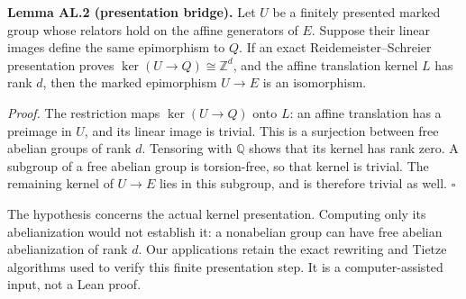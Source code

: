 \textbf{Lemma AL.2 (presentation bridge).} Let \(U\) be a finitely presented marked
group whose relators hold on the affine generators of \(E\). Suppose their
linear images define the same epimorphism to \(Q\). If an exact
Reidemeister--Schreier presentation proves
\(\ker(U\to Q)\cong\mathbb Z^d\), and the affine translation kernel \(L\)
has rank \(d\), then the marked epimorphism \(U\to E\) is an isomorphism.

\emph{Proof.} The restriction maps \(\ker(U\to Q)\) onto \(L\): an affine
translation has a preimage in \(U\), and its linear image is trivial.
This is a surjection between free abelian groups of rank \(d\). Tensoring
with \(\mathbb Q\) shows that its kernel has rank zero. A subgroup of a
free abelian group is torsion-free, so that kernel is trivial. The
remaining kernel of \(U\to E\) lies in this subgroup, and is therefore
trivial as well. \(\square\)

The hypothesis concerns the actual kernel presentation. Computing only
its abelianization would not establish it: a nonabelian group can have
free abelian abelianization of rank \(d\). Our applications retain the
exact rewriting and Tietze algorithms used to verify this finite
presentation step. It is a computer-assisted input, not a Lean proof.
